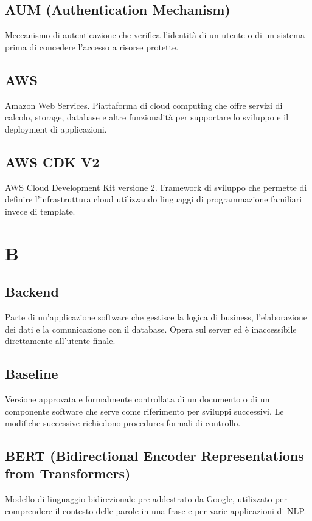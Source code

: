 \documentclass[a4paper,11pt]{article}
\begin{document}
\subsection{AUM (Authentication Mechanism)}
Meccanismo di autenticazione che verifica l'identità di un utente o di un sistema prima di concedere l'accesso a risorse protette.

\subsection{AWS}
Amazon Web Services. Piattaforma di cloud computing che offre servizi di calcolo, storage, database e altre funzionalità per supportare lo sviluppo e il deployment di applicazioni.

\subsection{AWS CDK V2}
AWS Cloud Development Kit versione 2. Framework di sviluppo che permette di definire l'infrastruttura cloud utilizzando linguaggi di programmazione familiari invece di template.

\newpage
\section{B}

\subsection{Backend}
Parte di un'applicazione software che gestisce la logica di business, l'elaborazione dei dati e la comunicazione con il database. Opera sul server ed è inaccessibile direttamente all'utente finale.

\subsection{Baseline}
Versione approvata e formalmente controllata di un documento o di un componente software che serve come riferimento per sviluppi successivi. Le modifiche successive richiedono procedures formali di controllo.

\subsection{BERT (Bidirectional Encoder Representations from Transformers)}
Modello di linguaggio bidirezionale pre-addestrato da Google, utilizzato per comprendere il contesto delle parole in una frase e per varie applicazioni di NLP.
\end{document}
